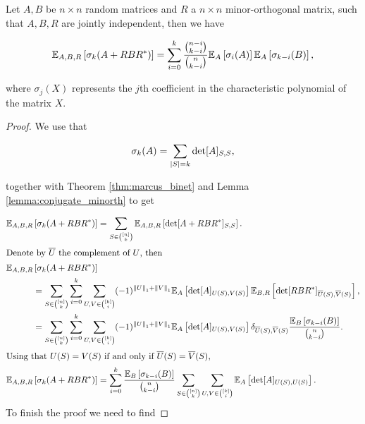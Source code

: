 \begin{theorem} \label{thm:implies_symmad}
    Let $A, B$ be $n\times n$ random matrices and $R$ a $n\times n$ minor-orthogonal matrix, such that $A, B, R$ are jointly independent, then we have

    \begin{equation*}
        \mathbb E_{A,B,R}\left[ \sigma_k(A + RBR^*) \right] =  \sum_{i=0}^k \frac{\binom{n-i}{k-i}}{\binom{n}{k-i}}\mathbb E_{A} \left[\sigma_i(A)\right] \mathbb E_{A}\left[\sigma_{k-i}(B)\right],
    \end{equation*}

    \noindent where $\sigma_j(X)$ represents the $j$th coefficient in the characteristic polynomial of the matrix $X$.
\end{theorem}

\begin{proof}
    We use that

    \begin{equation*}
        \sigma_k(A) = \sum_{\lvert S \rvert=k} \det[A]_{S,S},
    \end{equation*}

    \noindent together with Theorem \ref{thm:marcus_binet} and Lemma \ref{lemma:conjugate_minorth} to get %

    \begin{align*}
        \mathbb E_{A,B,R}&\left[ \sigma_k(A + RBR^*) \right] = \sum_{S \in \binom{[n]}{k}} \mathbb E_{A,B,R} \left[ \det[A + RBR^*]_{S,S} \right].\\ 
        \intertext{Denote by $\overline U$ the complement of $U$, then}
        \mathbb E_{A,B,R}&\left[ \sigma_k(A + RBR^*) \right]\\
        &= \sum_{S\in\binom{[n]}{k}} \sum_{i=0}^k \sum_{U,V\in \binom{[k]}{i}} (-1)^{\left\lVert U\right\rVert_1 + \left\lVert V\right\rVert_1} \mathbb E_A\left[ \det [A]_{U(S),V(S)} \right] \mathbb E_{B,R}\left[ \det[RBR^*]_{\overline{U}(S),\overline{V}(S)} \right],\\ 
        &= \sum_{S\in\binom{[n]}{k}} \sum_{i=0}^k \sum_{U,V\in \binom{[k]}{i}} (-1)^{\left\lVert U\right\rVert_1 + \left\lVert V\right\rVert_1} \mathbb E_A\left[ \det[A]_{U(S),V(S)} \right] \delta_{\overline{U}(S),\overline{V}(S)} \frac{\mathbb E_{B}\left[ \sigma_{k-i}(B)\right]}{\binom{n}{k-i}}.\\ 
        \intertext{Using that $U(S)=V(S)$ if and only if $\overline{U}(S) = \overline{V}(S)$,}
        \mathbb E_{A,B,R}&\left[ \sigma_k(A + RBR^*) \right] = \sum_{i=0}^k \frac{\mathbb E_{B}\left[ \sigma_{k-i}(B)\right]}{\binom{n}{k-i}} \sum_{S\in\binom{[n]}{k}} \sum_{U,V\in \binom{[k]}{i}}  \mathbb E_A\left[\det[A]_{U(S),U(S)} \right].
    \end{align*}
    To finish the proof we need to find


\end{proof}
